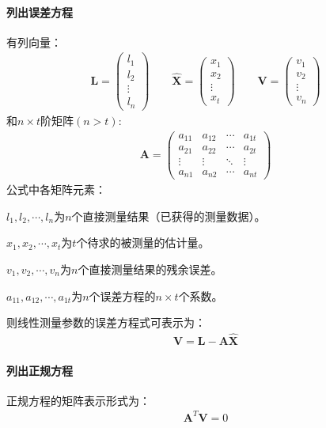 \documentclass{ctexart}
\begin{document}
				\paragraph{列出误差方程}
					有列向量：
					\begin{gather*}
						\bm{L}= 
						\begin{pmatrix}
							l_1 \\
							l_2 \\
							\vdots\\
							l_n
						\end{pmatrix}
						\qquad
					 	\bm{\hat{X}}= 
						\begin{pmatrix}
							x_1 \\
							x_2 \\
							\vdots\\
							x_t
						\end{pmatrix}
						\qquad
						\bm{V}= 
						\begin{pmatrix}
							v_1 \\
							v_2 \\
							\vdots\\
							v_n
						\end{pmatrix}
					\end{gather*}
					和$n \times t$阶矩阵$(n > t)$:
					\begin{gather*}
						\bm{A}= 
						\begin{pmatrix}
							a_{11} & a_{12} & \cdots& a_{1t} \\
							a_{21} & a_{22} & \cdots& a_{2t} \\
							\vdots & \vdots & \ddots& \vdots \\
							a_{n1} & a_{n2} & \cdots& a_{nt} 
						\end{pmatrix}
					\end{gather*}
					公式中各矩阵元素：\par
					$l_1,l_2,\cdots,l_n$为$n$个直接测量结果（已获得的测量数据）。\par
					$x_1,x_2,\cdots,x_t$为$t$个待求的被测量的估计量。\par
					$v_1,v_2,\cdots,v_n$为$n$个直接测量结果的残余误差。\par
					$a_{11}, a_{12},\cdots,a_{1t}$为$n$个误差方程的$n \times t$个系数。\par
					则线性测量参数的误差方程式可表示为：
					\begin{gather*}
						\bm{V}= \bm{L}-\bm{A}\bm{\hat{X}}
					\end{gather*}
				\paragraph{列出正规方程}
					正规方程的矩阵表示形式为：
					\begin{gather*}
						\bm{A}^T\bm{V}=0
					\end{gather*}
					
\end{document}
